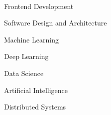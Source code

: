 

      ‌

      \begin{cvitems}
        \item {Frontend Development}
        \item {Software Design and Architecture}
        \item {Machine Learning}
        \item {Deep Learning}
        \item {Data Science}
        \item {Artificial Intelligence}
        \item {Distributed Systems}
      \end{cvitems}
      ‌

